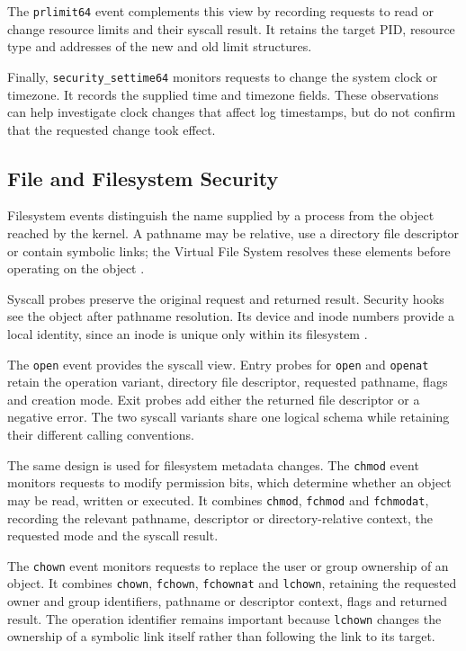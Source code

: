 The \texttt{prlimit64} event complements this view by recording requests
to read or change resource limits and their syscall result. It retains
the target PID, resource type and addresses of the new and old limit
structures.

Finally, \texttt{security\_settime64} monitors requests to change the
system clock or timezone. It records the supplied time and timezone
fields. These observations can help investigate clock changes that affect
log timestamps, but do not confirm that the requested change took effect.

\subsection{File and Filesystem Security}
\label{subsec:implementation-filesystem-hooks}

Filesystem events distinguish the name supplied by a process from the object
reached by the kernel. A pathname may be relative, use a directory file
descriptor or contain symbolic links; the Virtual File System resolves these
elements before operating on the object \cite{linuxPathnameLookup}.

Syscall probes preserve the original request and returned result. Security
hooks see the object after pathname resolution. Its device and inode numbers
provide a local identity, since an inode is unique only within its filesystem
\cite{linuxInodeIdentifiers}.

The \texttt{open} event provides the syscall view. Entry probes for
\texttt{open} and \texttt{openat} retain the operation variant, directory file
descriptor, requested pathname, flags and creation mode. Exit probes add either
the returned file descriptor or a negative error. The two syscall variants
share one logical schema while retaining their different calling conventions.

The same design is used for filesystem metadata changes. The \texttt{chmod}
event monitors requests to modify permission bits, which determine whether an
object may be read, written or executed. It combines \texttt{chmod},
\texttt{fchmod} and \texttt{fchmodat}, recording the relevant pathname,
descriptor or directory-relative context, the requested mode and the syscall
result.

The \texttt{chown} event monitors requests to replace the user or group ownership
of an object. It combines \texttt{chown}, \texttt{fchown},
\texttt{fchownat} and \texttt{lchown}, retaining the requested owner and group
identifiers, pathname or descriptor context, flags and returned result.
The operation identifier remains important because \texttt{lchown} changes the
ownership of a symbolic link itself rather than following the link to its
target.

